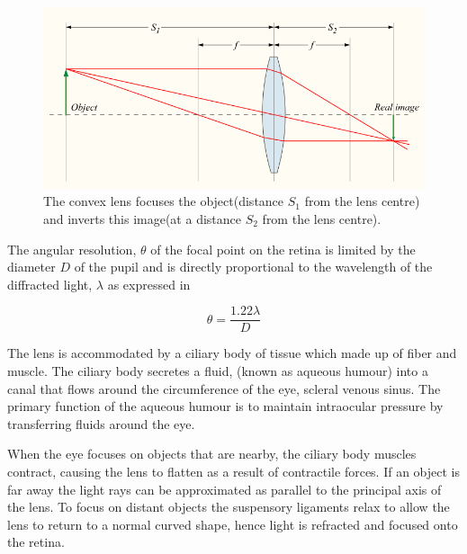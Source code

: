 \begin{figure}[htbp]
 \centering
   \includegraphics{figures/convergent_lens2}
 \caption{The convex lens focuses the object(distance $S_1$ from the lens centre) and inverts this image(at a distance $S_2$ from the lens centre). \cite{greivenkamp2004field}}
 \label{fig:convergent_lens}
\end{figure}


The angular resolution, $\theta$ of the focal point on the retina is limited by
the diameter $D$ of the pupil and is directly proportional to the wavelength of
the diffracted light, $\lambda$ as expressed in 

\begin{equation}
\theta=\frac{1.22\lambda}{D}
\label{eq:res_limit}
\end{equation}

The lens is accommodated by a ciliary body of tissue which made up of fiber and muscle.
The ciliary body secretes a fluid, (known as aqueous humour) into a canal that flows
around the circumference of the eye, scleral venous sinus.
\cite{bill1970effects,dvorak1934schlemm} The primary function of the aqueous humour
is to maintain intraocular pressure by transferring fluids around the eye.

When the eye focuses on objects that are nearby, the ciliary body muscles contract,
causing the lens to flatten as a result of contractile forces. If an object is far
away the light rays can be approximated as parallel to the principal axis of the lens.
To focus on distant objects the suspensory ligaments relax to allow the lens to return
to a normal curved shape, hence light is refracted and focused onto the retina.

